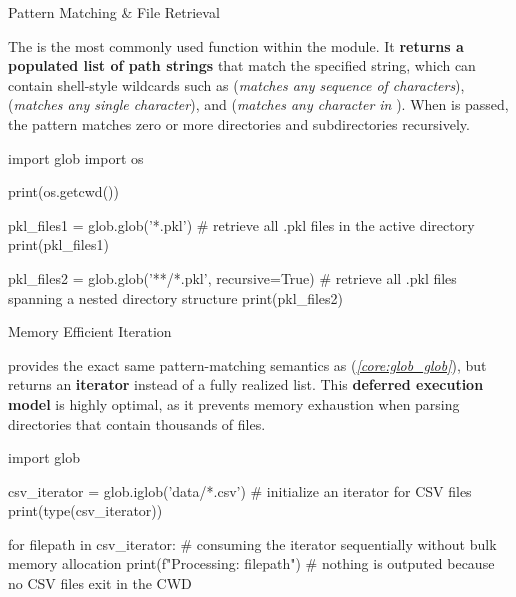 \documentclass[10pt]{article}
\begin{document}
    \begin{core}[label=core:glob_glob]{Pattern Matching \& File Retrieval}

      The  is the most commonly used function within the  module. It \textbf{returns a populated list of path strings} that match the specified  string, which can contain shell-style wildcards such as \textcode{*} (\textit{matches any sequence of characters}),  (\textit{matches any single character}), and \textcode{[seq]} (\textit{matches any character in} ). When  is passed, the \textcode{**} pattern matches zero or more directories and subdirectories recursively.

      \begin{pyconsole}

        import glob
        import os 

        print(os.getcwd())

        pkl_files1 = glob.glob('*.pkl') # retrieve all .pkl files in the active directory
        print(pkl_files1)

        pkl_files2 = glob.glob('**/*.pkl', recursive=True) # retrieve all .pkl files spanning a nested directory structure
        print(pkl_files2)

      \end{pyconsole}

    \end{core}

    \begin{core}{Memory Efficient Iteration}

       provides the exact same pattern-matching semantics as  (\textit{\autoref{core:glob_glob}}), but returns an \textbf{iterator} instead of a fully realized list. This \textbf{deferred execution model} is highly optimal, as it prevents memory exhaustion when parsing directories that contain thousands of files.

      \begin{pyconsole}

        import glob

        csv_iterator = glob.iglob('data/*.csv') # initialize an iterator for CSV files
        print(type(csv_iterator))

        for filepath in csv_iterator: # consuming the iterator sequentially without bulk memory allocation
            print(f"Processing: {filepath}") # nothing is outputed because no CSV files exit in the CWD

      \end{pyconsole}

    \end{core}
\end{document}
